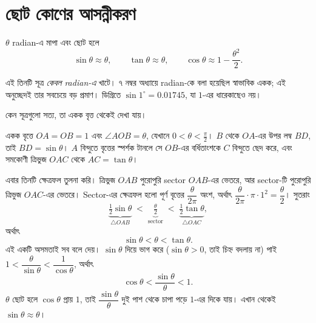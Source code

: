 \documentclass[11pt]{article}
\begin{document}
\section{ছোট কোণের আসন্নীকরণ}

\begin{idea}
$\theta$ radian-এ মাপা এবং ছোট হলে
\[
  \sin\theta \approx \theta, \qquad
  \tan\theta \approx \theta, \qquad
  \cos\theta \approx 1 - \frac{\theta^{2}}{2} .
\]
\end{idea}

এই তিনটি সূত্র \emph{কেবল radian-এ} খাটে। ৭ নম্বর অধ্যায়ে radian-কে বলা
হয়েছিল স্বাভাবিক একক; এই অনুচ্ছেদই তার সবচেয়ে বড় প্রমাণ। ডিগ্রিতে
$\sin 1^{\circ} = 0.01745$, যা $1$-এর ধারেকাছেও নয়।

কেন সূত্রগুলো সত্য, তা একক বৃত্ত থেকেই দেখা যায়।

\begin{center}
\end{center}

একক বৃত্তে $OA = OB = 1$ এবং $\angle AOB = \theta$, যেখানে
$0 < \theta < \tfrac{\pi}{2}$। $B$ থেকে $OA$-এর উপর লম্ব $BD$, তাই
$BD = \sin\theta$। $A$ বিন্দুতে বৃত্তের স্পর্শক টানলে সে $OB$-এর বর্ধিতাংশকে
$C$ বিন্দুতে ছেদ করে, এবং সমকোণী ত্রিভুজ $OAC$ থেকে $AC = \tan\theta$।

এবার তিনটি ক্ষেত্রফল তুলনা করি। ত্রিভুজ $OAB$ পুরোপুরি sector $OAB$-এর ভেতরে,
আর sector-টি পুরোপুরি ত্রিভুজ $OAC$-এর ভেতরে। Sector-এর ক্ষেত্রফল হলো পূর্ণ
বৃত্তের $\dfrac{\theta}{2\pi}$ অংশ, অর্থাৎ
$\dfrac{\theta}{2\pi} \cdot \pi \cdot 1^{2} = \dfrac{\theta}{2}$। সুতরাং
\[
  \underbrace{\tfrac{1}{2}\sin\theta}_{\triangle OAB}
  \;<\; \underbrace{\tfrac{\theta}{2}}_{\mathrm{sector}}
  \;<\; \underbrace{\tfrac{1}{2}\tan\theta}_{\triangle OAC} ,
\]
অর্থাৎ
\[
  \sin\theta < \theta < \tan\theta .
\]
এই একটি অসমতাই সব বলে দেয়। $\sin\theta$ দিয়ে ভাগ করে ($\sin\theta > 0$, তাই
চিহ্ন বদলায় না) পাই $1 < \dfrac{\theta}{\sin\theta} < \dfrac{1}{\cos\theta}$,
অর্থাৎ
\[
  \cos\theta < \frac{\sin\theta}{\theta} < 1 .
\]
$\theta$ ছোট হলে $\cos\theta$ প্রায় $1$, তাই $\dfrac{\sin\theta}{\theta}$
দুই পাশ থেকে চাপা পড়ে $1$-এর দিকে যায়। এখান থেকেই $\sin\theta \approx \theta$।
\end{document}
